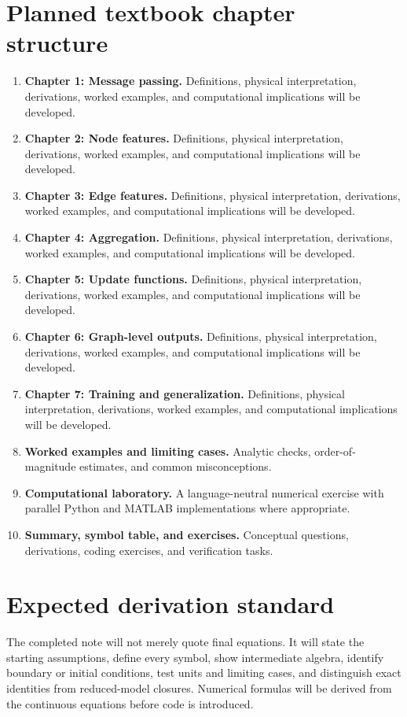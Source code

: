 \documentclass[11pt]{article}
\begin{document}
\section{Planned textbook chapter structure}
\begin{enumerate}[leftmargin=1.8em]
\item \textbf{Chapter 1: Message passing.} Definitions, physical interpretation, derivations, worked examples, and computational implications will be developed.
\item \textbf{Chapter 2: Node features.} Definitions, physical interpretation, derivations, worked examples, and computational implications will be developed.
\item \textbf{Chapter 3: Edge features.} Definitions, physical interpretation, derivations, worked examples, and computational implications will be developed.
\item \textbf{Chapter 4: Aggregation.} Definitions, physical interpretation, derivations, worked examples, and computational implications will be developed.
\item \textbf{Chapter 5: Update functions.} Definitions, physical interpretation, derivations, worked examples, and computational implications will be developed.
\item \textbf{Chapter 6: Graph-level outputs.} Definitions, physical interpretation, derivations, worked examples, and computational implications will be developed.
\item \textbf{Chapter 7: Training and generalization.} Definitions, physical interpretation, derivations, worked examples, and computational implications will be developed.
\item \textbf{Worked examples and limiting cases.} Analytic checks, order-of-magnitude estimates, and common misconceptions.
\item \textbf{Computational laboratory.} A language-neutral numerical exercise with parallel Python and MATLAB implementations where appropriate.
\item \textbf{Summary, symbol table, and exercises.} Conceptual questions, derivations, coding exercises, and verification tasks.
\end{enumerate}

\section{Expected derivation standard}
The completed note will not merely quote final equations. It will state the starting assumptions, define every symbol, show intermediate algebra, identify boundary or initial conditions, test units and limiting cases, and distinguish exact identities from reduced-model closures. Numerical formulas will be derived from the continuous equations before code is introduced.
\end{document}
